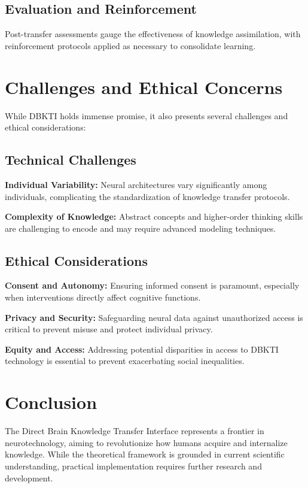 \documentclass[12pt]{article}
\begin{document}
\subsection*{Evaluation and Reinforcement}
Post-transfer assessments gauge the effectiveness of knowledge assimilation, with reinforcement protocols applied as necessary to consolidate learning.

\section*{Challenges and Ethical Concerns}
While DBKTI holds immense promise, it also presents several challenges and ethical considerations:

\subsection*{Technical Challenges}
\textbf{Individual Variability:} Neural architectures vary significantly among individuals, complicating the standardization of knowledge transfer protocols.

\textbf{Complexity of Knowledge:} Abstract concepts and higher-order thinking skills are challenging to encode and may require advanced modeling techniques.

\subsection*{Ethical Considerations}
\textbf{Consent and Autonomy:} Ensuring informed consent is paramount, especially when interventions directly affect cognitive functions.

\textbf{Privacy and Security:} Safeguarding neural data against unauthorized access is critical to prevent misuse and protect individual privacy.

\textbf{Equity and Access:} Addressing potential disparities in access to DBKTI technology is essential to prevent exacerbating social inequalities.

\section*{Conclusion}
The Direct Brain Knowledge Transfer Interface represents a frontier in neurotechnology, aiming to revolutionize how humans acquire and internalize knowledge. While the theoretical framework is grounded in current scientific understanding, practical implementation requires further research and development.
\end{document}
